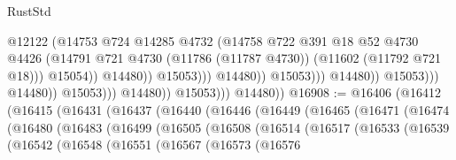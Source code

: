 \begin{lexlean}{RustStd}
\begin{coremodule}
                                                          @12122
                                                          (@14753
                                                            @724
                                                            @14285
                                                            @4732
                                                            (@14758
                                                              @722
                                                              @391
                                                              @18
                                                              @52
                                                              @4730
                                                              @4426
                                                              (@14791
                                                                @721
                                                                @4730
                                                                (@11786 (@11787 @4730))
                                                                (@11602 (@11792 @721 @18)))
                                                              @15054))
                                                          @14480))
                                                      @15053)))
                                                @14480))
                                            @15053)))
                                      @14480))
                                  @15053)))
                            @14480))
                        @15053)))
                  @14480))
              @15053)))
        @14480))
@16908 := @16406
    (@16412
      (@16415
        (@16431
          (@16437
            (@16440
              (@16446
                (@16449
                  (@16465
                    (@16471
                      (@16474
                        (@16480
                          (@16483
                            (@16499
                              (@16505
                                (@16508
                                  (@16514
                                    (@16517
                                      (@16533
                                        (@16539
                                          (@16542
                                            (@16548
                                              (@16551
                                                (@16567
                                                  (@16573
                                                    (@16576

\end{coremodule}
\end{lexlean}
